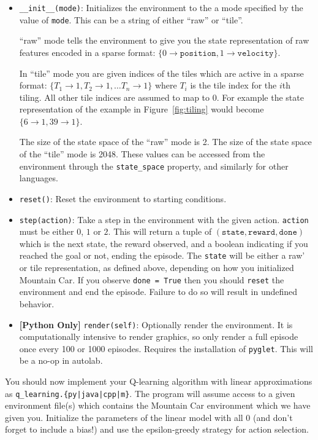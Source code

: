 \begin{itemize}
    \item \texttt{\_\_init\_\_(mode)}: Initializes the environment to the a mode specified by the value of \texttt{mode}. This can be a string of either ``raw'' or ``tile''. 
    
    ``raw'' mode tells the environment to give you the state representation of raw features encoded in a sparse format: $\{0 \rightarrow \texttt{position}, 1 \rightarrow \texttt{velocity}\}$.
    
    In ``tile'' mode you are given indices of the tiles which are active in a sparse format: $\{T_1 \rightarrow 1, T_2 \rightarrow 1, \ldots T_n \rightarrow 1\}$ where $T_i$ is the tile index for the $i$th tiling. All other tile indices are assumed to map to 0. For example the state representation of the example in Figure~\ref{fig:tiling} would become $\{6 \rightarrow 1, 39 \rightarrow 1\}$.
    
    The size of the state space of the ``raw'' mode is 2. The size of the state space of the ``tile'' mode is 2048. These values can be accessed from the environment through the \texttt{state\_space} property, and similarly for other languages.
    \item \texttt{reset()}: Reset the environment to starting conditions.
    \item \texttt{step(action)}: Take a step in the environment with the given action. \texttt{action} must be either $0$, $1$ or $2$. This will return a tuple of $(\texttt{state}, \texttt{reward}, \texttt{done})$ which is the next state, the reward observed, and a boolean indicating if you reached the goal or not, ending the episode. The \texttt{state} will be either a raw' or tile representation, as defined above, depending on how you initialized Mountain Car.  If you observe \texttt{done = True} then you should \texttt{reset} the environment and end the episode. Failure to do so will result in undefined behavior.
    \item \textbf{[Python Only]} \texttt{render(self)}: Optionally render the environment. It is computationally intensive to render graphics, so only render a full episode once every 100 or 1000 episodes. Requires the installation of \texttt{pyglet}. This will be a no-op in autolab.
\end{itemize}

You should now implement your Q-learning algorithm with linear approximations as \newline\texttt{q\_learning.\{py|java|cpp|m\}}. The program will assume access to a given environment file(s) which contains the Mountain Car environment which we have given you. Initialize the parameters of the linear model with all 0 (and don't forget to include a bias!) and use the epsilon-greedy strategy for action selection.

